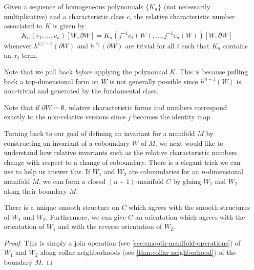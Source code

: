 \begin{definition}\label{defn:relative-characteristic-number-polynomial}
	Given a sequence of homogeneous polynomials $\{K_n\}$ (not necessarily multiplicative) and a characteristic class $c$, the relative characteristic number associated to $K$ is given by
	\[
		K_n(c_1, \ldots, c_n)[W,\partial W] = K_n(j^{-1}c_1(W), \ldots, j^{-1}c_n(W))[W,\partial W]
	\]
	whenever $h^{|c_i|-1}(\partial W)$ and $h^{|c_i|}(\partial W)$ are trivial for all $i$ such that $K_n$ contains an $x_i$ term.
\end{definition}

\begin{remark}
	Note that we pull back \emph{before} applying the polynomial $K$. This is because pulling back a top-dimensional form on $W$ is not generally possible since $h^{n-1}(W)$ is non-trivial and generated by the fundamental class.
\end{remark}

\begin{remark}
	Note that if $\partial W=\emptyset$, relative characteristic forms and numbers correspond exactly to the non-relative versions since $j$ becomes the identity map.
\end{remark}

Turning back to our goal of defining an invariant for a manifold $M$ by constructing an invariant of a coboundary $W$ of $M$, we next would like to understand how relative invariants such as the relative characteristic numbers change with respect to a change of coboundary.
There is a elegant trick we can use to help us answer this. If $W_1$ and $W_2$ are coboundaries for an $n$-dimensional manifold $M$, we can form a closed $(n+1)$-manifold $C$ by gluing $W_1$ and $W_2$ along their boundary $M$.

\begin{proposition}
	There is a unique smooth structure on $C$ which agrees with the smooth structures of $W_1$ and $W_2$. Furthermore, we can give $C$ an orientation which agrees with the orientation of $W_1$ and with the reverse orientation of $W_2$.
\end{proposition}
\begin{proof}
	This is simply a join operation (see \cref{sec:smooth-manifold-operations}) of $W_1$ and $W_2$ along collar neighborhoods (see \cref{thm:collar-neighborhood}) of the boundary $M$.
\end{proof}

